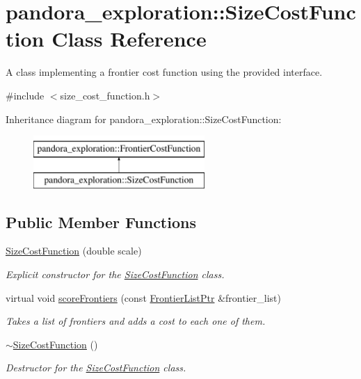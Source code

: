 \hypertarget{classpandora__exploration_1_1_size_cost_function}{\section{pandora\-\_\-exploration\-:\-:\-Size\-Cost\-Function \-Class \-Reference}
\label{classpandora__exploration_1_1_size_cost_function}
}


\-A class implementing a frontier cost function using the provided interface.  




{\ttfamily \#include $<$size\-\_\-cost\-\_\-function.\-h$>$}

\-Inheritance diagram for pandora\-\_\-exploration\-:\-:\-Size\-Cost\-Function\-:\begin{figure}[H]
\begin{center}
\leavevmode
\includegraphics[height=2.000000cm]{classpandora__exploration_1_1_size_cost_function}
\end{center}
\end{figure}
\subsection*{\-Public \-Member \-Functions}
\begin{DoxyCompactItemize}
\item 
\hyperlink{classpandora__exploration_1_1_size_cost_function_a77903e97453ce0f802bb4b6159898c13}{\-Size\-Cost\-Function} (double scale)
\begin{DoxyCompactList}\small\item\em \-Explicit constructor for the \hyperlink{classpandora__exploration_1_1_size_cost_function}{\-Size\-Cost\-Function} class. \end{DoxyCompactList}\item 
virtual void \hyperlink{classpandora__exploration_1_1_size_cost_function_a8d56949087483e7bd6d838b631bff52d}{score\-Frontiers} (const \hyperlink{namespacepandora__exploration_a6f3b1959fca391e2ef3ac46b6e96be7a}{\-Frontier\-List\-Ptr} \&frontier\-\_\-list)
\begin{DoxyCompactList}\small\item\em \-Takes a list of frontiers and adds a cost to each one of them. \end{DoxyCompactList}\item 
\hyperlink{classpandora__exploration_1_1_size_cost_function_a1d6c85e7649d236d6c31c97fa474c1b8}{$\sim$\-Size\-Cost\-Function} ()
\begin{DoxyCompactList}\small\item\em \-Destructor for the \hyperlink{classpandora__exploration_1_1_size_cost_function}{\-Size\-Cost\-Function} class. \end{DoxyCompactList}\end{DoxyCompactItemize}


